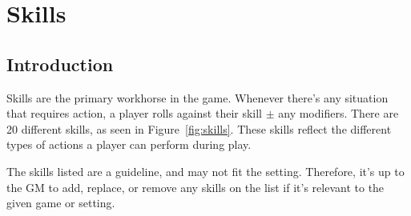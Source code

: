 \chapter{Skills} \label{chap:skills}
\section{Introduction}
Skills are the primary workhorse in the game. 
Whenever there's any situation that requires action, a player rolls against their skill $\pm$ any modifiers. 
There are 20 different skills, as seen in Figure~\ref{fig:skills}. 
These skills reflect the different types of actions a player can perform during play.

\note The skills listed are a guideline, and may not fit the setting. 
Therefore, it's up to the GM to add, replace, or remove any skills on the list if it's relevant to the given game or setting.





